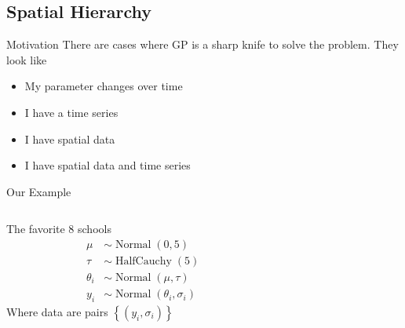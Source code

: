 \documentclass{beamer}
\begin{document}
\subsection{Spatial Hierarchy}
\begin{frame}{Motivation}
    There are cases where GP is a sharp knife to solve the problem. They look like
    \begin{itemize}
        \item My parameter changes over time \cite{rolling_regression}
        \item I have a time series \cite{forecasting_gp}
        \item I have spatial data
        \item I have spatial data and time series
    \end{itemize}
\end{frame}
\begin{frame}{Our Example}
    \begin{columns}
        \begin{column}{0.5\linewidth}
            The favorite 8 schools
            \begin{align*}
                \mu &\sim \operatorname{Normal}(0, 5)\\
    \tau &\sim \operatorname{HalfCauchy}(5)\\
    \theta_i &\sim \operatorname{Normal}(\mu, \tau)\\
    y_i &\sim \operatorname{Normal}(\theta_i, \sigma_i)
            \end{align*}
        Where data are pairs $\left\{(y_i, \sigma_i)\right\}$
        
        \end{column}
        \begin{column}{0.5\linewidth}
        \end{column}
    \end{columns}
\end{frame}
\end{document}
